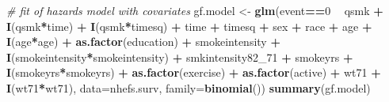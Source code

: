 \documentclass[10pt,]{book}
\newenvironment{Shaded}{\begin{snugshade}}{\end{snugshade}}
\newcommand{\CommentTok}[1]{\textcolor[rgb]{0.56,0.35,0.01}{\textit{#1}}}
\newcommand{\DataTypeTok}[1]{\textcolor[rgb]{0.13,0.29,0.53}{#1}}
\newcommand{\DecValTok}[1]{\textcolor[rgb]{0.00,0.00,0.81}{#1}}
\newcommand{\KeywordTok}[1]{\textcolor[rgb]{0.13,0.29,0.53}{\textbf{#1}}}
\newcommand{\NormalTok}[1]{#1}
\newcommand{\OperatorTok}[1]{\textcolor[rgb]{0.81,0.36,0.00}{\textbf{#1}}}
\newcommand{\StringTok}[1]{\textcolor[rgb]{0.31,0.60,0.02}{#1}}
\begin{document}
\begin{Shaded}
\begin{Highlighting}[]
\CommentTok{# fit of hazards model with covariates}
\NormalTok{gf.model <-}\StringTok{ }\KeywordTok{glm}\NormalTok{(event}\OperatorTok{==}\DecValTok{0} \OperatorTok{~}\StringTok{ }\NormalTok{qsmk }\OperatorTok{+}\StringTok{ }\KeywordTok{I}\NormalTok{(qsmk}\OperatorTok{*}\NormalTok{time) }\OperatorTok{+}\StringTok{ }\KeywordTok{I}\NormalTok{(qsmk}\OperatorTok{*}\NormalTok{timesq)}
                \OperatorTok{+}\StringTok{ }\NormalTok{time }\OperatorTok{+}\StringTok{ }\NormalTok{timesq }\OperatorTok{+}\StringTok{ }\NormalTok{sex }\OperatorTok{+}\StringTok{ }\NormalTok{race }\OperatorTok{+}\StringTok{ }\NormalTok{age }\OperatorTok{+}\StringTok{ }\KeywordTok{I}\NormalTok{(age}\OperatorTok{*}\NormalTok{age)}
                \OperatorTok{+}\StringTok{ }\KeywordTok{as.factor}\NormalTok{(education) }\OperatorTok{+}\StringTok{ }\NormalTok{smokeintensity }
                \OperatorTok{+}\StringTok{ }\KeywordTok{I}\NormalTok{(smokeintensity}\OperatorTok{*}\NormalTok{smokeintensity) }\OperatorTok{+}\StringTok{ }\NormalTok{smkintensity82_}\DecValTok{71} 
                \OperatorTok{+}\StringTok{ }\NormalTok{smokeyrs }\OperatorTok{+}\StringTok{ }\KeywordTok{I}\NormalTok{(smokeyrs}\OperatorTok{*}\NormalTok{smokeyrs) }\OperatorTok{+}\StringTok{ }\KeywordTok{as.factor}\NormalTok{(exercise) }
                \OperatorTok{+}\StringTok{ }\KeywordTok{as.factor}\NormalTok{(active) }\OperatorTok{+}\StringTok{ }\NormalTok{wt71 }\OperatorTok{+}\StringTok{ }\KeywordTok{I}\NormalTok{(wt71}\OperatorTok{*}\NormalTok{wt71), }
                \DataTypeTok{data=}\NormalTok{nhefs.surv, }\DataTypeTok{family=}\KeywordTok{binomial}\NormalTok{())}
\KeywordTok{summary}\NormalTok{(gf.model)}
\end{Highlighting}
\end{Shaded}
\end{document}
